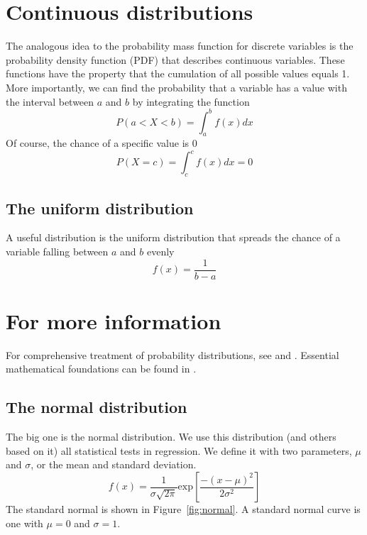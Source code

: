 \section{Continuous distributions}
\label{sec:condist}
The analogous idea to the probability mass function for discrete variables is the probability density function (PDF) that describes continuous variables. These functions have the property that the cumulation of all possible values equals 1. More importantly, we can find the probability that a variable has a value with the interval between $a$ and $b$ by integrating the function
\begin{equation}
P\left(a < X < b\right) = \int_a^b f(x)dx
\end{equation}
Of course, the chance of a specific value is 0
\begin{equation}
P\left(X = c\right) = \int_c^c f(x)dx = 0
\end{equation}
\subsection{The uniform distribution}

A useful distribution is the uniform distribution that spreads the chance of a variable falling between $a$ and $b$ evenly
\begin{equation}
f(x) = \frac{1}{b-a}
\end{equation}

\section*{For more information}
For comprehensive treatment of probability distributions, see \citep{rice2007mathematical} and \citep{agresti}. Essential mathematical foundations can be found in \citep{gill2006essential}.\subsection{The normal distribution}
\label{sec:normaldist}
The big one is the normal distribution. We use this distribution (and others based on it) all statistical tests in regression. We define it with two parameters, $\mu$ and $\sigma$, or the mean and standard deviation.
\begin{equation}
f(x) = \frac{1}{\sigma\sqrt{2\pi}}\mbox{exp}\left[\frac{-\left(x-\mu\right)^2}{2\sigma^2}\right]
\end{equation}
The standard normal is shown in Figure~\ref{fig:normal}. A standard normal curve is one with $\mu = 0$ and $\sigma = 1$.

